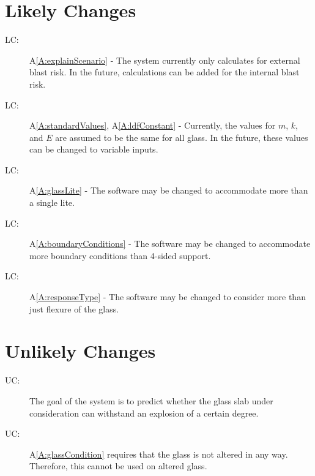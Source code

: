 \documentclass[12pt]{article}
\newcounter{lcnum}
\newcommand{\lcthelcnum}{LC\thelcnum}
\newcounter{ucnum}
\newcommand{\uctheucnum}{UC\theucnum}
\begin{document}
\section{Likely Changes}
\label{Sec:LCs}
\begin{description}
\item[\lcthelcnum\label{LC:Calculate-Internal-Blask-Risk}:]A\ref{A:explainScenario} - The system currently only calculates for external blast risk. In the future, calculations can be added for the internal blast risk.
\end{description}
\begin{description}
\item[\lcthelcnum\label{LC:Variable-Values-of-m,k,E}:]A\ref{A:standardValues}, A\ref{A:ldfConstant} - Currently, the values for $m$, $k$, and $E$ are assumed to be the same for all glass. In the future, these values can be changed to variable inputs.
\end{description}
\begin{description}
\item[\lcthelcnum\label{LC:Accomodate-More-than-Single-Lite}:]A\ref{A:glassLite} - The software may be changed to accommodate more than a single lite.
\end{description}
\begin{description}
\item[\lcthelcnum\label{LC:Accomodate-More-Boundary-Conditions}:]A\ref{A:boundaryConditions} - The software may be changed to accommodate more boundary conditions than 4-sided support.
\end{description}
\begin{description}
\item[\lcthelcnum\label{LC:Consider-More-than-Flexure-Glass}:]A\ref{A:responseType} - The software may be changed to consider more than just flexure of the glass.
\end{description}
\section{Unlikely Changes}
\label{Sec:UCs}
\begin{description}
\item[\uctheucnum\label{UC:Predict-Withstanding-of-Certain-Degree}:]The goal of the system is to predict whether the glass slab under consideration can withstand an explosion of a certain degree.
\end{description}
\begin{description}
\item[\uctheucnum\label{UC:Accommodate-Altered-Glass}:]A\ref{A:glassCondition} requires that the glass is not altered in any way. Therefore, this cannot be used on altered glass.
\end{description}
\end{document}
